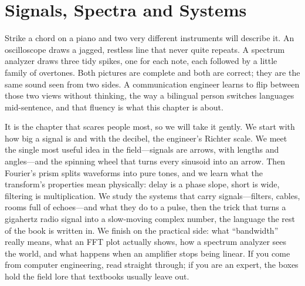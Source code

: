 \chapter{Signals, Spectra and Systems}
\label{ch:signals}

\begin{chapterintro}
Strike a chord on a piano and two very different instruments will describe it. An oscilloscope
draws a jagged, restless line that never quite repeats. A spectrum analyzer draws three tidy
spikes, one for each note, each followed by a little family of overtones. Both pictures are
complete and both are correct; they are the same sound seen from two sides. A communication
engineer learns to flip between those two views without thinking, the way a bilingual person
switches languages mid-sentence, and that fluency is what this chapter is about.

It is the chapter that scares people most, so we will take it gently. We start with how big a
signal is and with the decibel, the engineer's Richter scale. We meet the single most useful idea
in the field---signals are arrows, with lengths and angles---and the spinning wheel that turns
every sinusoid into an arrow. Then Fourier's prism splits waveforms into pure tones, and we learn
what the transform's properties mean physically: delay is a phase slope, short is wide, filtering
is multiplication. We study the systems that carry signals---filters, cables, rooms full of
echoes---and what they do to a pulse, then the trick that turns a gigahertz radio signal into a
slow-moving complex number, the language the rest of the book is written in. We finish on the
practical side: what ``bandwidth'' really means, what an FFT plot actually shows, how a spectrum
analyzer sees the world, and what happens when an amplifier stops being linear. If you come from
computer engineering, read straight through; if you are an expert, the boxes hold the field lore
that textbooks usually leave out.
\end{chapterintro}


